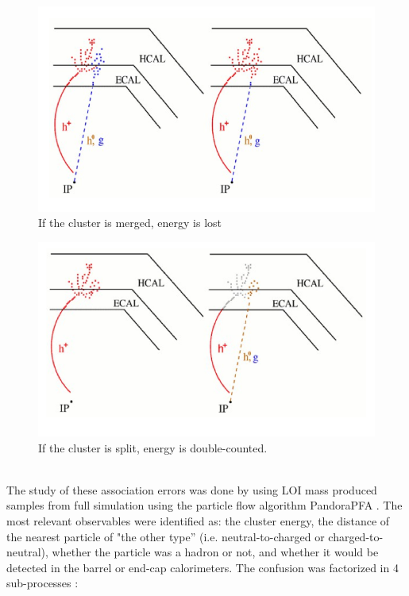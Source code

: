 \documentclass[a4paper,12pt]{article}
\begin{document}
\noindent
\begin{minipage}{\linewidth}
\centering
\begin{minipage}{0.4\linewidth}
\begin{figure}[H]
   \includegraphics[width=\linewidth]{cluster_merge.png} 
    \caption{If the cluster is merged, energy is lost}
    \label{fig:asso_errors}
\end{figure}
\end{minipage}
      \hspace{0.05\linewidth}
      \begin{minipage}{0.4\linewidth}
\begin{figure}[H]
    \includegraphics[width=\linewidth]{cluster_split.png} 
      \caption{If the cluster is split, energy is double-counted.}
   \label{fig:asso_errors2}
\end{figure}
\end{minipage}
\end{minipage}\\[0.4cm]

\noindent
The study of these association errors was done by using LOI mass produced samples from full simulation using the particle flow algorithm PandoraPFA  \cite{Thomson}. The most relevant observables were identified as: the cluster energy, the distance of the nearest particle of "the other type'' (i.e. neutral-to-charged or charged-to-neutral), whether the particle was a hadron or not, and whether it would be detected in the barrel or end-cap calorimeters.
The confusion was factorized in 4 sub-processes \cite{Berggren}:
\end{document}

